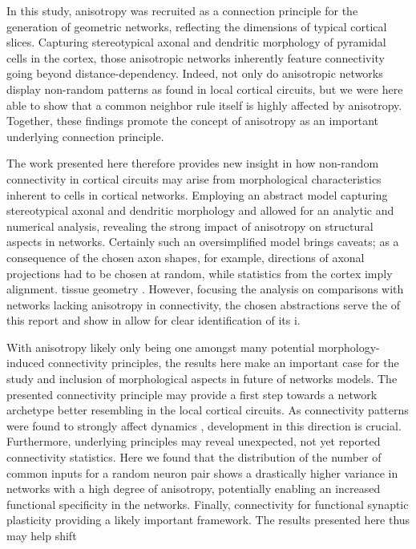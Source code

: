 In this study, anisotropy was recruited as a connection principle for
the generation of geometric networks, reflecting the dimensions of
typical cortical slices. Capturing stereotypical axonal and dendritic
morphology of pyramidal cells in the cortex, those anisotropic
networks inherently feature connectivity going beyond
distance-dependency. Indeed, not only do anisotropic networks display
non-random patterns as found in local cortical circuits, but we were
here able to show that a common neighbor rule itself is highly
affected by anisotropy. Together, these findings promote the concept
of anisotropy as an important underlying connection principle.

The work presented here therefore provides new insight in how
non-random connectivity in cortical circuits may arise from
morphological characteristics inherent to cells in cortical
networks. Employing an abstract model capturing stereotypical axonal
and dendritic morphology and allowed for an analytic and numerical
analysis, revealing the strong impact of anisotropy on structural
aspects in networks. Certainly such an oversimplified model brings
caveats; as a consequence of the chosen axon shapes, for example,
directions of axonal projections had to be chosen at random, while
statistics from the cortex imply alignment. tissue geometry . However,
focusing the analysis on comparisons with networks lacking anisotropy
in connectivity, the chosen abstractions serve the of this report and
show in allow for clear identification of its i.

With anisotropy likely only being one amongst many potential
morpho\-logy-induced connectivity principles, the results here make an
important case for the study and inclusion of morphological aspects in
future of networks models. The presented connectivity principle may
provide a first step towards a network archetype better resembling in
the local cortical circuits. As connectivity patterns were found to
strongly affect dynamics \parencite{Pernice2011, Zhao2011},
development in this direction is crucial. Furthermore, underlying
principles may reveal unexpected, not yet reported connectivity
statistics. Here we found that the distribution of the number of
common inputs for a random neuron pair shows a drastically higher
variance in networks with a high degree of anisotropy, potentially
enabling an increased functional specificity in the networks. Finally,
connectivity for functional synaptic plasticity providing a likely
important framework. The results presented here thus may help shift 

